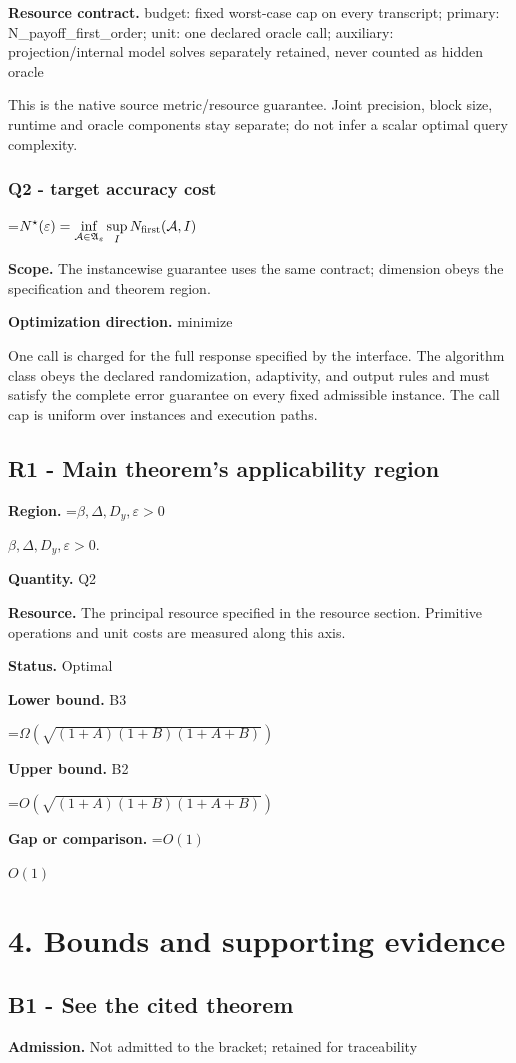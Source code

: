 \documentclass[10pt,a4paper]{article}
\newcommand{\AtlasMath}[1]{\par\begingroup\centering\setbox0=\hbox{$\displaystyle #1$}\ifdim\wd0>1.4\linewidth\typeout{ATLAS WIDE FORMULA: \the\wd0}\fi\ifdim\wd0>\linewidth\resizebox{\linewidth}{!}{\box0}\else\box0\fi\par\endgroup}
\newcommand{\AtlasInlineMath}[1]{\begingroup\setbox0=\hbox{$#1$}\ifdim\wd0>.4\linewidth\endgroup\AtlasMath{#1}\else\endgroup$#1$\fi}
\begin{document}
\textbf{Resource contract.} budget: fixed worst-case cap on every transcript; primary: N\_payoff\_first\_order; unit: one declared oracle call; auxiliary: projection/internal model solves separately retained, never counted as hidden oracle

This is the native source metric/resource guarantee. Joint precision, block size, runtime and oracle components stay separate; do not infer a scalar optimal query complexity.

\subsubsection{Q2 - target accuracy cost}
\AtlasMath{N^\star(\varepsilon)=\inf_{\mathcal A\in\mathfrak A_\varepsilon}\sup_I N_{\rm first}(\mathcal A,I)}
\textbf{Scope.} The instancewise guarantee uses the same contract; dimension obeys the specification and theorem region.

\textbf{Optimization direction.} minimize

One call is charged for the full response specified by the interface. The algorithm class obeys the declared randomization, adaptivity, and output rules and must satisfy the complete error guarantee on every fixed admissible instance. The call cap is uniform over instances and execution paths.

\subsection{R1 - Main theorem's applicability region}
\textbf{Region.} \AtlasInlineMath{\beta,\Delta,D_y,\varepsilon>0}.

\textbf{Quantity.} Q2

\textbf{Resource.} The principal resource specified in the resource section. Primitive operations and unit costs are measured along this axis.

\textbf{Status.} Optimal

\textbf{Lower bound.} B3

\AtlasMath{\Omega(\sqrt{(1+A)(1+B)(1+A+B)})}
\textbf{Upper bound.} B2

\AtlasMath{O(\sqrt{(1+A)(1+B)(1+A+B)})}
\textbf{Gap or comparison.} \AtlasInlineMath{O(1)}

\section{4. Bounds and supporting evidence}
\subsection{B1 - See the cited theorem}
\textbf{Admission.} Not admitted to the bracket; retained for traceability
\end{document}
